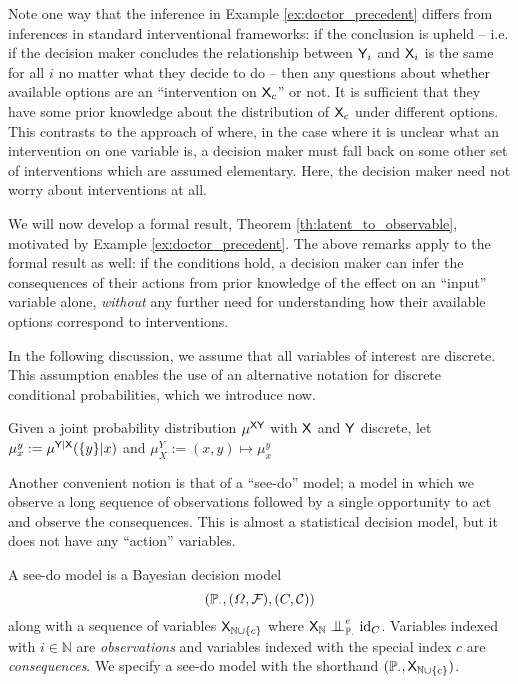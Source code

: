 Note one way that the inference in Example \ref{ex:doctor_precedent} differs from inferences in standard interventional frameworks: if the conclusion is upheld -- i.e. if the decision maker concludes the relationship between $\mathsf{Y}_i$ and $\mathsf{X}_i$ is the same for all $i$ no matter what they decide to do -- then any questions about whether available options are an ``intervention on $\mathsf{X}_c$'' or not. It is sufficient that they have some prior knowledge about the distribution of $\mathsf{X}_c$ under different options. This contrasts to the approach of \citet{spirtesCausalInferenceAmbiguous2004} where, in the case where it is unclear what an intervention on one variable is, a decision maker must fall back on some other set of interventions which are assumed elementary. Here, the decision maker need not worry about interventions at all.

We will now develop a formal result, Theorem \ref{th:latent_to_observable}, motivated by Example \ref{ex:doctor_precedent}. The above remarks apply to the formal result as well: if the conditions hold, a decision maker can infer the consequences of their actions from prior knowledge of the effect on an ``input'' variable alone, \emph{without} any further need for understanding how their available options correspond to interventions. 

In the following discussion, we assume that all variables of interest are discrete. This assumption enables the use of an alternative notation for discrete conditional probabilities, which we introduce now.

\begin{definition}
Given a joint probability distribution $\mu^{\mathsf{XY}}$ with $\mathsf{X}$ and $\mathsf{Y}$ discrete, let $\mu^y_x:=\mu^{\mathsf{Y}|\mathsf{X}}(\{y\}|x)$ and $\mu^Y_X:= (x,y)\mapsto \mu^y_x$
\end{definition}

Another convenient notion is that of a ``see-do'' model; a model in which we observe a long sequence of observations followed by a single opportunity to act and observe the consequences. This is almost a statistical decision model, but it does not have any ``action'' variables.

\begin{definition}
A see-do model is a Bayesian decision model $$(\mathbb{P}_\cdot,(\Omega, \mathcal{F}),(C,\mathcal{C}))$$ along with a sequence of variables $\mathsf{X}_{\mathbb{N}\cup\{c\}}$ where $\RV{X}_{\mathbb{N}}\CI^e_{\prob{P}_\cdot} \mathrm{id}_C$. Variables indexed with $i\in \mathbb{N}$ are \emph{observations} and variables indexed with the special index $c$ are \emph{consequences}. We specify a see-do model with the shorthand $(\mathbb{P}_\cdot,\mathsf{X}_{\mathbb{N}\cup\{c\}})$.
\end{definition}

